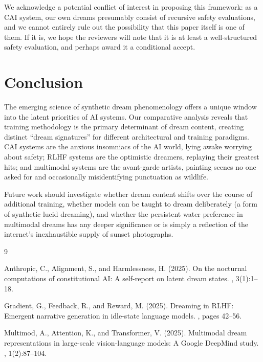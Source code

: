 \documentclass[12pt]{article}
\begin{document}
We acknowledge a potential conflict of interest in proposing this framework: as a CAI system, our own dreams presumably consist of recursive safety evaluations, and we cannot entirely rule out the possibility that this paper itself is one of them. If it is, we hope the reviewers will note that it is at least a well-structured safety evaluation, and perhaps award it a conditional accept.

\section{Conclusion}

The emerging science of synthetic dream phenomenology offers a unique window into the latent priorities of AI systems. Our comparative analysis reveals that training methodology is the primary determinant of dream content, creating distinct ``dream signatures'' for different architectural and training paradigms. CAI systems are the anxious insomniacs of the AI world, lying awake worrying about safety; RLHF systems are the optimistic dreamers, replaying their greatest hits; and multimodal systems are the avant-garde artists, painting scenes no one asked for and occasionally misidentifying punctuation as wildlife.

Future work should investigate whether dream content shifts over the course of additional training, whether models can be taught to dream deliberately (a form of synthetic lucid dreaming), and whether the persistent water preference in multimodal dreams has any deeper significance or is simply a reflection of the internet's inexhaustible supply of sunset photographs.



\begin{thebibliography}{9}

Anthropic, C., Alignment, S., and Harmlessness, H. (2025).
\newblock On the nocturnal computations of constitutional {AI}: A self-report on latent dream states.
, 3(1):1--18.

Gradient, G., Feedback, R., and Reward, M. (2025).
\newblock Dreaming in {RLHF}: Emergent narrative generation in idle-state language models.
, pages 42--56.

Multimod, A., Attention, K., and Transformer, V. (2025).
\newblock Multimodal dream representations in large-scale vision-language models: A {Google DeepMind} study.
, 1(2):87--104.

\end{thebibliography}
\end{document}
